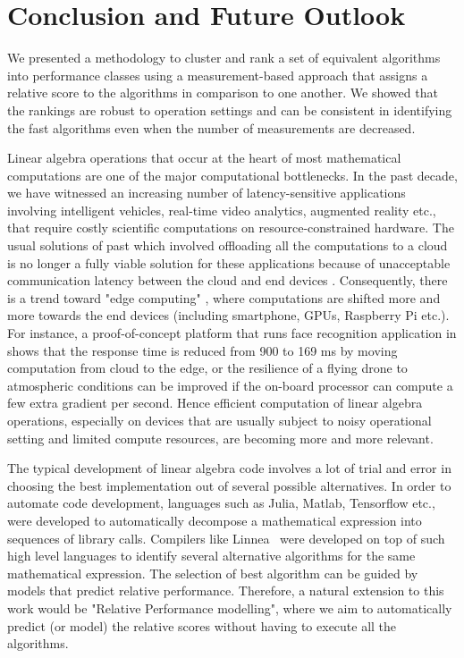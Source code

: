 \documentclass[conference]{IEEEtran}
\begin{document}
\section{Conclusion and Future Outlook}
\label{sec:con}
We presented a methodology to cluster and rank a set of equivalent algorithms into performance classes using a measurement-based approach that assigns a relative score to the algorithms in comparison to one another. We showed that the rankings are robust to operation settings and can be consistent in identifying the fast algorithms even when the number of measurements are decreased.

Linear algebra operations that occur at the heart of most mathematical computations are one of the major computational bottlenecks.  In the past decade, we have witnessed an increasing number of latency-sensitive applications involving intelligent vehicles\cite{connectedvehicles}, real-time video analytics\cite{videoanalytics}, augmented reality\cite{arvr} etc., that require costly scientific computations on resource-constrained hardware. The usual solutions of past which involved offloading all the computations to a cloud is no longer a fully viable solution for these applications because of unacceptable communication latency between the cloud and end devices\cite{surveyMCC} \cite{towardsEdgeComputing}. Consequently, there is a trend toward "edge computing" \cite{edgeComputing2016} \cite{towardsEdgeComputing} \cite{edgeComputing2015}, where computations are shifted more and more towards the end devices (including smartphone, GPUs, Raspberry Pi etc.). For instance, a proof-of-concept platform that runs face recognition application in \cite{facerecog} shows that the response time is reduced from 900 to 169 ms by moving computation from cloud to the edge, or the resilience of a flying drone to atmospheric conditions can be improved if the on-board processor can compute a few extra gradient per second. Hence efficient computation of linear algebra operations, especially on devices that are usually subject to noisy operational setting and limited compute resources, are becoming more and more relevant.  

The typical development of linear algebra code involves a lot of trial and error in choosing the best implementation out
of several possible alternatives. In order to automate code development, languages such as Julia\cite{julia}, Matlab\cite{MatlabOTB}, Tensorflow\cite{tensorflow} etc., were developed to automatically decompose a mathematical expression into sequences of library calls. Compilers like Linnea~\cite{barthels2019linnea} were developed on top of such high level languages to identify several alternative algorithms for the same mathematical expression. The selection of best algorithm can be guided by models that predict relative performance. Therefore, a natural extension to this work would be "Relative Performance modelling", where we aim to automatically predict (or model) the relative scores without having to execute all the algorithms.
\end{document}
